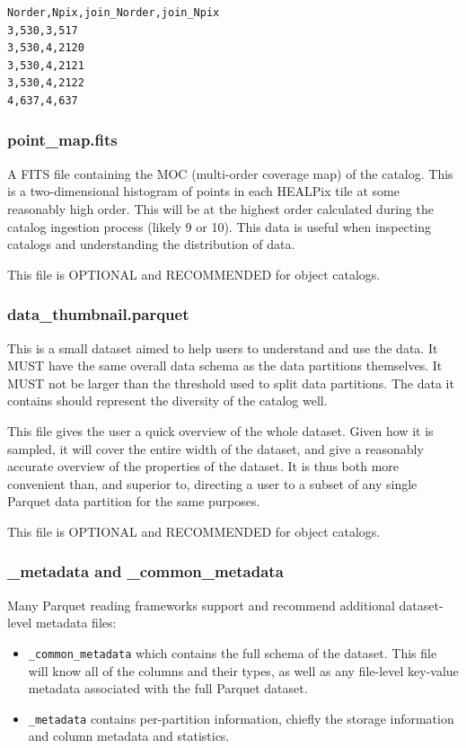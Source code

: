 \documentclass[11pt,a4paper]{ivoa}
\begin{document}
\begin{minipage}{\linewidth}
\begin{lstlisting}[caption=Example \texttt{partition\_join\_info.csv} file contents, label=fig:examplePartitionJoinInfoCsv]    
Norder,Npix,join_Norder,join_Npix
3,530,3,517
3,530,4,2120
3,530,4,2121
3,530,4,2122
4,637,4,637
\end{lstlisting}
\end{minipage}

\subsubsection{point\_map.fits} 

A FITS file containing the MOC (multi-order coverage map) of the catalog.
This is a two-dimensional histogram of points in each HEALPix tile at some reasonably high order.
This will be at the highest order calculated during the catalog ingestion process (likely 9 or 10). 
This data is useful when inspecting catalogs and understanding the distribution of data. 

This file is OPTIONAL and RECOMMENDED for object catalogs.

\subsubsection{data\_thumbnail.parquet} 
This is a small dataset aimed to help users to understand and use the data. 
It MUST have the same overall data schema as the data partitions themselves.
It MUST not be larger than the threshold used to split data partitions.
The data it contains should represent the diversity of the catalog well. \par

This file gives the user a quick overview of the whole dataset.
Given how it is sampled, it will cover the entire width of the dataset, and give a reasonably accurate overview of the properties of the dataset. 
It is thus both more convenient than, and superior to, directing a user to a subset of any single Parquet data partition for the same purposes.

This file is OPTIONAL and RECOMMENDED for object catalogs.

\subsubsection{\_metadata and \_common\_metadata} 

Many Parquet reading frameworks support and recommend additional dataset-level metadata files:
\begin{itemize}
    \item \texttt{\_common\_metadata} which contains the full schema of the dataset. 
    This file will know all of the columns and their types, as well as any file-level key-value metadata associated with the full Parquet dataset.
    \item \texttt{\_metadata} contains per-partition information, chiefly the storage information and column metadata and statistics.
\end{itemize}
\end{document}
